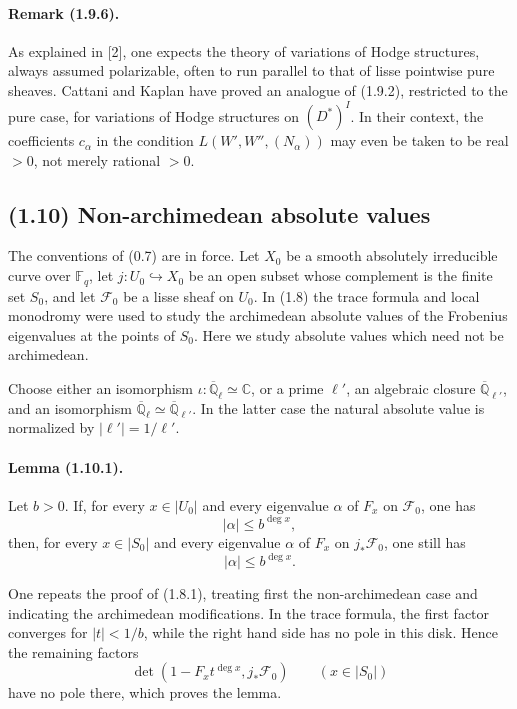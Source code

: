 \documentclass[11pt]{article}
\theoremstyle{remark}
\newcommand{\Qlb}{\overline{\mathbb{Q}}_\ell}
\newcommand{\QQ}{\mathbb{Q}}
\newcommand{\CC}{\mathbb{C}}
\newcommand{\Fq}{\mathbb{F}_q}
\begin{document}
\paragraph{Remark (1.9.6).}
As explained in [2], one expects the theory of variations of Hodge structures, always assumed polarizable, often to run parallel to that of lisse pointwise pure sheaves. Cattani and Kaplan have proved an analogue of (1.9.2), restricted to the pure case, for variations of Hodge structures on \((D^*)^I\). In their context, the coefficients \(c_\alpha\) in the condition \(L(W',W'',(N_\alpha))\) may even be taken to be real \(>0\), not merely rational \(>0\).

\subsection*{(1.10) Non-archimedean absolute values}

The conventions of (0.7) are in force. Let \(X_0\) be a smooth absolutely irreducible curve over \(\Fq\), let \(j:U_0\hookrightarrow X_0\) be an open subset whose complement is the finite set \(S_0\), and let \(\mathcal F_0\) be a lisse sheaf on \(U_0\). In (1.8) the trace formula and local monodromy were used to study the archimedean absolute values of the Frobenius eigenvalues at the points of \(S_0\). Here we study absolute values which need not be archimedean.

Choose either an isomorphism \(\iota:\Qlb\simeq\CC\), or a prime \(\ell'\), an algebraic closure \(\overline{\QQ}_{\ell'}\), and an isomorphism \(\Qlb\simeq\overline{\QQ}_{\ell'}\). In the latter case the natural absolute value is normalized by \(|\ell'|=1/\ell'\).

\paragraph{Lemma (1.10.1).}
Let \(b>0\). If, for every \(x\in |U_0|\) and every eigenvalue \(\alpha\) of \(F_x\) on \(\mathcal F_0\), one has
\[
|\alpha|\le b^{\deg x},
\]
then, for every \(x\in |S_0|\) and every eigenvalue \(\alpha\) of \(F_x\) on \(j_{*}\mathcal F_0\), one still has
\[
|\alpha|\le b^{\deg x}.
\]

One repeats the proof of (1.8.1), treating first the non-archimedean case and indicating the archimedean modifications. In the trace formula, the first factor converges for \(|t|<1/b\), while the right hand side has no pole in this disk. Hence the remaining factors
\[
\det(1-F_x t^{\deg x},j_{*}\mathcal F_0)
\qquad (x\in |S_0|)
\]
have no pole there, which proves the lemma.
\end{document}

